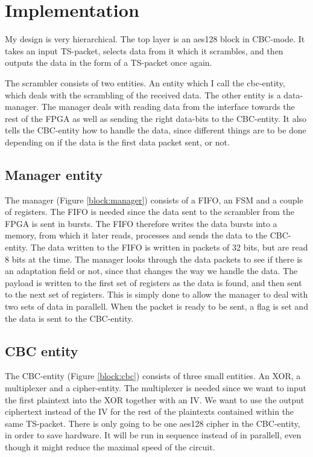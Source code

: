 \section{Implementation}
My design is very hierarchical. The top layer is an aes128 block in 
CBC-mode. It takes an input TS-packet, selects data from it which it 
scrambles, and then outputs the data in the form of a TS-packet once 
again.

The scrambler consists of two entities. An entity which I call the 
cbc-entity, which deals with the scrambling of the received data. The 
other entity is a data-manager. The manager deals with reading data 
from the interface towards the rest of the FPGA as well as sending the 
right data-bits to the CBC-entity. It also tells the CBC-entity how to 
handle the data, since different things are to be done depending on if 
the data is the first data packet sent, or not.

\subsection{Manager entity}
The manager (Figure \ref{block:manager}) consists of a FIFO, an FSM and 
a couple of registers. The FIFO is needed since the data sent to the 
scrambler from the FPGA is sent in bursts. The FIFO therefore writes 
the data bursts into a memory, from which it later reads, processes and 
sends the data to the CBC-entity. The data written to the FIFO is 
written in packets of 32 bits, but are read 8 bits at the time. The 
manager looks through the data packets to see if there is an adaptation 
field or not, since that changes the way we handle the data. The 
payload is written to the first set of registers as the data is found, 
and then sent to the next set of registers. This is simply done to 
allow the manager to deal with two sets of data in parallell. When the 
packet is ready to be sent, a flag is set and the data is sent to the 
CBC-entity. 

\subsection{CBC entity}
The CBC-entity (Figure \ref{block:cbc}) consists of three small 
entities. An XOR, a multiplexer and a cipher-entity. The multiplexer is 
needed since we want to input the first plaintext into the XOR together 
with an IV. We want to use the output ciphertext instead of the IV for 
the rest of the plaintexts contained within the same TS-packet. There 
is only going to be one aes128 cipher in the CBC-entity, in order to 
save hardware. It will be run in sequence instead of in parallell, even 
though it might reduce the maximal speed of the circuit.


